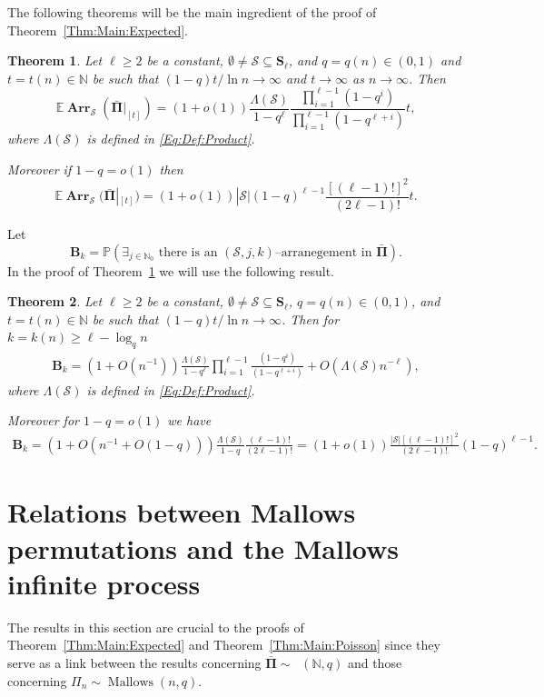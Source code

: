 \documentclass[letterpaper,11pt]{article}
\newtheorem{theorem}{Theorem}[section]
\theoremstyle{definition}
\theoremstyle{remark}
\renewcommand{\ge}{\geqslant}
\DeclareMathOperator{\Mallow}{Mallows}
\DeclareMathOperator{\Mallows}{Mallows_{seq}}
\newcommand{\bE}{\mathbb{E}}
\newcommand{\bS}{\mathbf{S}}
\newcommand{\productO}{\Lambda(\cS)}
\newcommand{\Arr}{\ensuremath{\operatorname{\mathbf{Arr}}}}
\newcommand{\Pra}[1]{\mathbb{P}\left(#1\right)}
\newcommand{\bB}{\mathbf{B}}
\newcommand{\barPi}{\bar {\mathbf \Pi}}
\newcommand{\NN}{\mathbb{N}}
\newcommand{\cS}{\mathcal{S}}
\begin{document}
The following theorems will be the main ingredient of the proof of Theorem~\ref{Thm:Main:Expected}. 


\begin{theorem}\label{Thm:ExpectedValueProcess}
	Let $\ell\ge 2$ be a constant, $\emptyset\neq\cS\subseteq \bS_\ell$, and $q=q(n)\in (0,1)$ and $t=t(n)\in \NN$ be such that $(1-q)t/\ln n\to \infty$ and $t\to\infty$ as $n\to\infty$. Then
	\[
	\bE \Arr_{\cS}(\barPi|_{[t]}) =(1+o(1)) \frac{\productO}{1-q^\ell}\frac{\prod_{i=1}^{\ell-1}(1-q^i)}{\prod_{i=1}^{\ell-1}(1-q^{\ell+i})}t,
	\]
	where $\productO$ is defined in \eqref{Eq:Def:Product}.
	
	Moreover if $1-q=o(1)$ then 
	\[
	\bE \Arr_{\cS}(\barPi|_{[t]}) =(1+o(1)) |\cS|(1-q)^{\ell-1}\frac{[(\ell-1)!]^2}{(2\ell-1)!}t. 
	\]
\end{theorem}
Let
\[\bB_{k}=\Pra{\exists_{j\in\NN_0 }\text{ there is an $(\cS,j,k)$--arranegement in $\barPi$}}.\]
In the proof of Theorem~\ref{Thm:ExpectedValueProcess} we will use the following result.
\begin{theorem}\label{Thm:Qk:value}
	Let $\ell\ge 2$ be a constant, $\emptyset\neq\cS\subseteq \bS_\ell$, $q=q(n)\in (0,1)$, and $t=t(n)\in \NN$ be such that $(1-q)t/\ln n\to \infty$. Then for $k=k(n)\ge \ell -\log_q n$
	\begin{equation*}
		\begin{split}
			\bB_{k}
			=(1+O(n^{-1}))
			\frac{\productO}{1-q^\ell}
			\prod_{i=1}^{\ell-1}\frac{(1-q^i)}{(1-q^{\ell+i})}+O(\productO n^{-\ell}),
		\end{split}
	\end{equation*}
	where $\productO$ is defined in \eqref{Eq:Def:Product}.
	
	Moreover for $1-q=o(1)$ we have
	\begin{equation*}
		\begin{split}
			\bB_{k}=(1+O(n^{-1}+O(1-q)))\frac{\productO}{1-q}\frac{(\ell-1)!}{(2\ell-1)!}
			=(1+o(1))\frac{|\cS|[(\ell-1)!]^2}{(2\ell-1)!}(1-q)^{\ell-1}.
		\end{split}
	\end{equation*}
\end{theorem}




\section{Relations between Mallows permutations and the Mallows infinite process}


The results in this section are crucial to the proofs of Theorem~\ref{Thm:Main:Expected} and Theorem~\ref{Thm:Main:Poisson} since they serve as a link between the results concerning $\barPi\sim\Mallows(\NN,q)$  and those concerning $\varPi_n\sim\Mallow(n,q)$.
\end{document}
